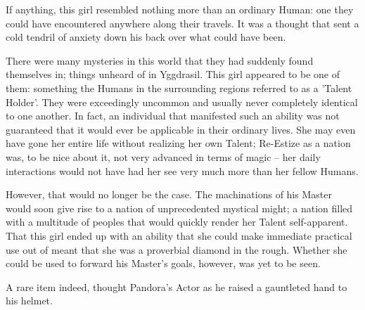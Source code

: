  

If anything, this girl resembled nothing more than an ordinary Human: one they could have encountered anywhere along their travels. It was a thought that sent a cold tendril of anxiety down his back over what could have been.

 

There were many mysteries in this world that they had suddenly found themselves in; things unheard of in Yggdrasil. This girl appeared to be one of them: something the Humans in the surrounding regions referred to as a 'Talent Holder'. They were exceedingly uncommon and usually never completely identical to one another. In fact, an individual that manifested such an ability was not guaranteed that it would ever be applicable in their ordinary lives. She may even have gone her entire life without realizing her own Talent; Re-Estize as a nation was, to be nice about it, not very advanced in terms of magic – her daily interactions would not have had her see very much more than her fellow Humans.

 

However, that would no longer be the case. The machinations of his Master would soon give rise to a nation of unprecedented mystical might; a nation filled with a multitude of peoples that would quickly render her Talent self-apparent. That this girl ended up with an ability that she could make immediate practical use out of meant that she was a proverbial diamond in the rough. Whether she could be used to forward his Master’s goals, however, was yet to be seen.


A rare item indeed, thought Pandora’s Actor as he raised a gauntleted hand to his helmet.
